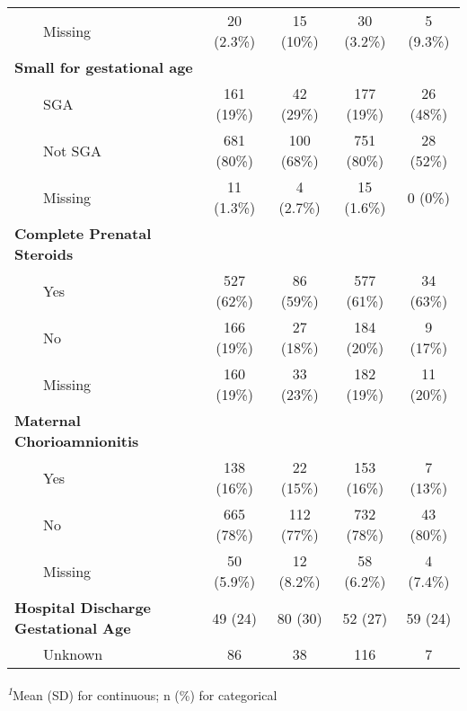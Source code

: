\begin{longtable}{lcccc}
    Missing & 20 (2.3\%) & 15 (10\%) & 30 (3.2\%) & 5 (9.3\%) \\ 
\textbf{Small for gestational age} &  &  &  &  \\ 
    SGA & 161 (19\%) & 42 (29\%) & 177 (19\%) & 26 (48\%) \\ 
    Not SGA & 681 (80\%) & 100 (68\%) & 751 (80\%) & 28 (52\%) \\ 
    Missing & 11 (1.3\%) & 4 (2.7\%) & 15 (1.6\%) & 0 (0\%) \\ 
\textbf{Complete Prenatal Steroids} &  &  &  &  \\ 
    Yes & 527 (62\%) & 86 (59\%) & 577 (61\%) & 34 (63\%) \\ 
    No & 166 (19\%) & 27 (18\%) & 184 (20\%) & 9 (17\%) \\ 
    Missing & 160 (19\%) & 33 (23\%) & 182 (19\%) & 11 (20\%) \\ 
\textbf{Maternal Chorioamnionitis} &  &  &  &  \\ 
    Yes & 138 (16\%) & 22 (15\%) & 153 (16\%) & 7 (13\%) \\ 
    No & 665 (78\%) & 112 (77\%) & 732 (78\%) & 43 (80\%) \\ 
    Missing & 50 (5.9\%) & 12 (8.2\%) & 58 (6.2\%) & 4 (7.4\%) \\ 
\textbf{Hospital Discharge Gestational Age} & 49 (24) & 80 (30) & 52 (27) & 59 (24) \\ 
    Unknown & 86 & 38 & 116 & 7 \\ 
\bottomrule
\end{longtable}
\begin{minipage}{\linewidth}
\textsuperscript{\textit{1}}Mean (SD) for continuous; n (\%) for categorical\\
\end{minipage}

